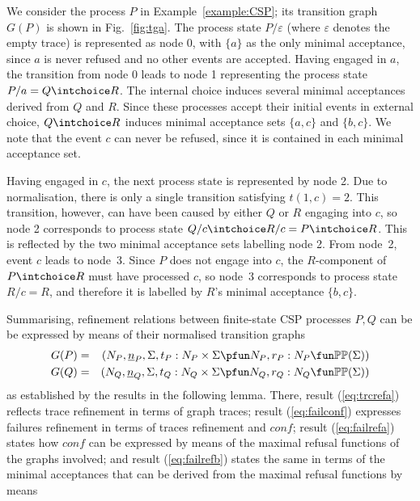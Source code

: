 \begin{example}\label{ex:a}
We consider the process $P$ in Example~\ref{example:CSP}; its transition
graph $G(P)$ is shown in Fig.~\ref{fig:tga}. The process state
$P/\varepsilon$ (where $\varepsilon$ denotes the empty trace) is represented
as node 0, with $\{ a\}$ as the only minimal acceptance, since $a$ is never
refused and no other events are accepted. Having engaged in $a$, the
transition from node 0 leads to node 1 representing the process state $P/a
= Q\intchoice R$. The internal choice induces several minimal acceptances
derived from $Q$ and $R$. Since these processes accept their initial events
in external choice, $Q\intchoice R$ induces minimal acceptance sets $\{a,c\}$
and $\{b,c\}$. We note that the event $c$ can never be refused, since it is
contained in each minimal acceptance set.

Having engaged in $c$, the next process state is represented by node 2. Due
to normalisation, there is only a single transition satisfying $t(1,c) = 2$.
This transition, however, can have been caused by either $Q$ or $R$ engaging
into $c$, so node 2 corresponds to process state $Q/c \intchoice R/c = P
\intchoice R$. This is reflected by the two minimal acceptance sets labelling
node 2. From node~2, event $c$ leads to node~3. Since $P$ does not engage
into $c$, the $R$-component of $P\intchoice R$ must have processed $c$, so
node~3 corresponds to process state $R/c = R$, and therefore it is labelled
by $R$'s minimal acceptance $\{b,c\}$. \xbox
\end{example}
%
Summarising, refinement relations between finite-state CSP processes $P, Q$ can be be
expressed by means of their normalised transition graphs
\begin{eqnarray*}
G(P) & = & ( N_P, {\ii n}_P, \Sigma, t_P : N_P\times\Sigma \pfun N_P, r_P : N_P \fun \mathbb{P}\mathbb{P}(\Sigma))
\\
G(Q) & = & ( N_Q, {\ii n}_Q, \Sigma, t_Q : N_Q\times\Sigma \pfun N_Q, r_Q : N_Q \fun \mathbb{P}\mathbb{P}(\Sigma))
\end{eqnarray*}
%
as established by the results  in the following lemma. There, result
(\ref{eq:trcrefa}) reflects trace refinement in terms of graph traces; result
(\ref{eq:failconf}) expresses failures refinement in terms of traces
refinement and $conf$; result (\ref{eq:failrefa}) states how $conf$ can be
expressed by means of the maximal refusal functions of the graphs involved;
and result (\ref{eq:failrefb}) states the same in terms of the minimal
acceptances that can be derived from the maximal refusal functions by means
